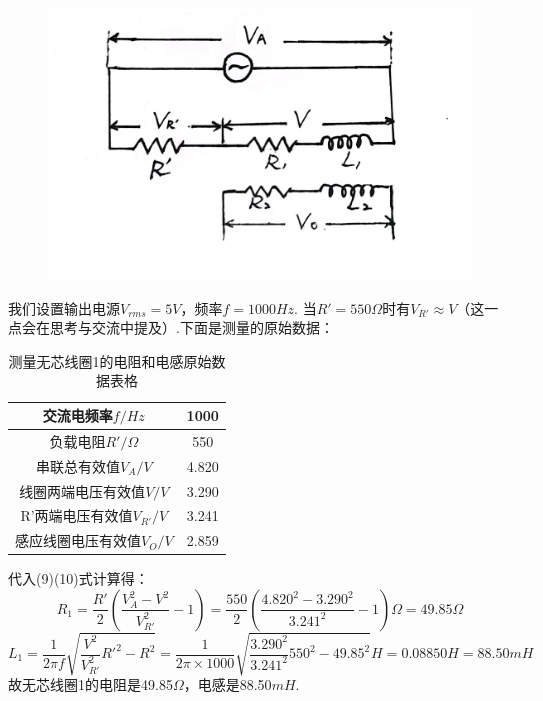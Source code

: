 \documentclass[UTF8]{ctexart}
\begin{document}
\begin{figure}[H]\begin{center}
    \includegraphics*[scale = 0.1]{5.jpg}
\end{center}\end{figure}
\vspace{-2em}
我们设置输出电源$V_{rms}=5V$，频率$f=1000Hz$. 当$R'=550\Omega$时有$V_{R'}\approx V$（这一点会在思考与交流中提及）.下面是测量的原始数据：
\begin{table}[H]\begin{center}
    \caption{测量无芯线圈1的电阻和电感原始数据表格}
    \begin{tabular}{|c|c|}
        \hline
        交流电频率$f/Hz$&1000\\
        \hline
        负载电阻$R'/\Omega$&550\\
        \hline
        串联总有效值$V_A/V$&4.820\\
        \hline
        线圈两端电压有效值$V/V$&3.290\\
        \hline
        R'两端电压有效值$V_{R'}/V$&3.241\\
        \hline
        感应线圈电压有效值$V_O/V$&2.859\\
        \hline
        \end{tabular}
\end{center}\end{table}
代入(9)(10)式计算得：
\[R_1=\frac{R'}{2}(\frac{V_A^2-V^2}{V_{R'}^2}-1)
=\frac{550}{2}(\frac{4.820^2-3.290^2}{3.241^2}-1)\Omega=49.85\Omega
\]
\[L_1=\frac{1}{2\pi f}\sqrt{\frac{V^2}{V_{R'}^2}R'^2-R^2}
=\frac{1}{2\pi\times 1000}\sqrt{\frac{3.290^2}{3.241^2}550^2-49.85^2}H=0.08850H=88.50mH
\]
故无芯线圈1的电阻是49.85$\Omega$，电感是88.50$mH$.
\end{document}
